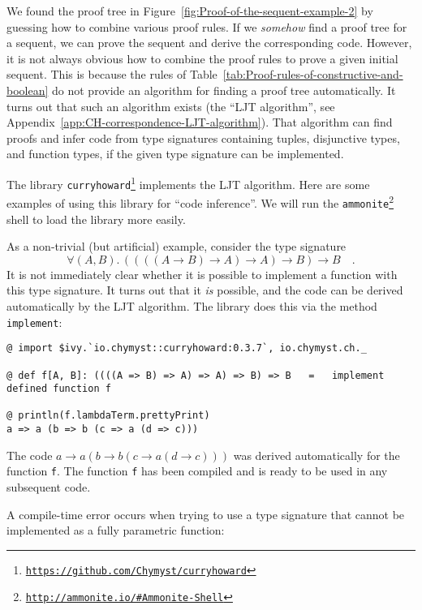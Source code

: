 We found the proof tree in Figure~\ref{fig:Proof-of-the-sequent-example-2}
by guessing how to combine various proof rules. If we \emph{somehow}
find a proof tree for a sequent, we can prove the sequent and derive
the corresponding code. However, it is not always obvious how to combine
the proof rules to prove a given initial sequent. This is because
the rules of Table~\ref{tab:Proof-rules-of-constructive-and-boolean}
do not provide an algorithm for finding a proof tree automatically.
It turns out that such an algorithm exists (the \textsf{``}LJT
algorithm\textsf{''}, see Appendix~\ref{app:CH-correspondence-LJT-algorithm}).
That algorithm can find proofs and infer code from type signatures
containing tuples, disjunctive types, and function types, if the given
type signature can be implemented.

The library \texttt{curryhoward}\footnote{\texttt{\href{https://github.com/Chymyst/curryhoward}{https://github.com/Chymyst/curryhoward}}}
implements the LJT algorithm. Here are some examples of using this
library for \textsf{``}code inference\textsf{''}. We will run
the \texttt{ammonite}\footnote{\texttt{\href{http://ammonite.io/\#Ammonite-Shell}{http://ammonite.io/\#Ammonite-Shell}}}
shell to load the library more easily.

As a non-trivial (but artificial) example, consider the type signature
\[
\forall(A,B).\,\left(\left(\left(\left(A\rightarrow B\right)\rightarrow A\right)\rightarrow A\right)\rightarrow B\right)\rightarrow B\quad.
\]
It is not immediately clear whether it is possible to implement a
function with this type signature. It turns out that it \emph{is}
possible, and the code can be derived automatically by the LJT algorithm.
The library does this via the method \lstinline!implement!:
\begin{lstlisting}
@ import $ivy.`io.chymyst::curryhoward:0.3.7`, io.chymyst.ch._

@ def f[A, B]: ((((A => B) => A) => A) => B) => B   =   implement
defined function f

@ println(f.lambdaTerm.prettyPrint)
a => a (b => b (c => a (d => c)))
\end{lstlisting}
The code $a\rightarrow a\left(b\rightarrow b\left(c\rightarrow a\left(d\rightarrow c\right)\right)\right)$
was derived automatically for the function \lstinline!f!. The function
\lstinline!f! has been compiled and is ready to be used in any subsequent
code.

A compile-time error occurs when trying to use a type signature that
cannot be implemented as a fully parametric function:

